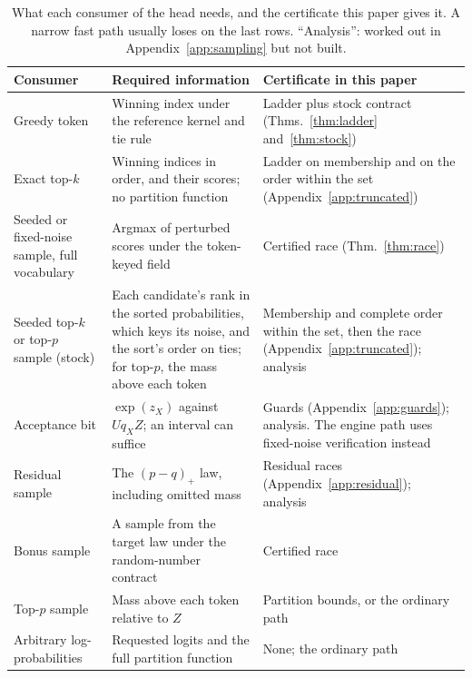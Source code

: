 \begin{table}[htbp]
\tablefont\centering
\caption{What each consumer of the head needs, and the certificate this paper gives it. A narrow fast path usually loses on the last rows. ``Analysis'': worked out in Appendix~\ref{app:sampling} but not built.}
\label{tab:consumers}
\vskip 0.05in
\begin{tabularx}{\linewidth}{@{}P{3.4cm}YP{5.4cm}@{}}\toprule
Consumer & Required information & Certificate in this paper\\\midrule
Greedy token & Winning index under the reference kernel and tie rule & Ladder plus stock contract (Thms.~\ref{thm:ladder} and~\ref{thm:stock})\\\addlinespace[3pt]
Exact top-$k$ & Winning indices in order, and their scores; no partition function & Ladder on membership and on the order within the set (Appendix~\ref{app:truncated})\\\addlinespace[3pt]
Seeded or fixed-noise sample, full vocabulary & Argmax of perturbed scores under the token-keyed field & Certified race (Thm.~\ref{thm:race})\\\addlinespace[3pt]
Seeded top-$k$ or top-$p$ sample (stock) & Each candidate's rank in the sorted probabilities, which keys its noise, and the sort's order on ties; for top-$p$, the mass above each token & Membership and complete order within the set, then the race (Appendix~\ref{app:truncated}); analysis\\\addlinespace[3pt]
Acceptance bit & $\exp(z_X)$ against $Uq_XZ$; an interval can suffice & Guards (Appendix~\ref{app:guards}); analysis. The engine path uses fixed-noise verification instead\\\addlinespace[3pt]
Residual sample & The $(p-q)_+$ law, including omitted mass & Residual races (Appendix~\ref{app:residual}); analysis\\\addlinespace[3pt]
Bonus sample & A sample from the target law under the random-number contract & Certified race\\\addlinespace[3pt]
Top-$p$ sample & Mass above each token relative to $Z$ & Partition bounds, or the ordinary path\\\addlinespace[3pt]
Arbitrary log-probabilities & Requested logits and the full partition function & None; the ordinary path\\\bottomrule
\end{tabularx}
\end{table}

